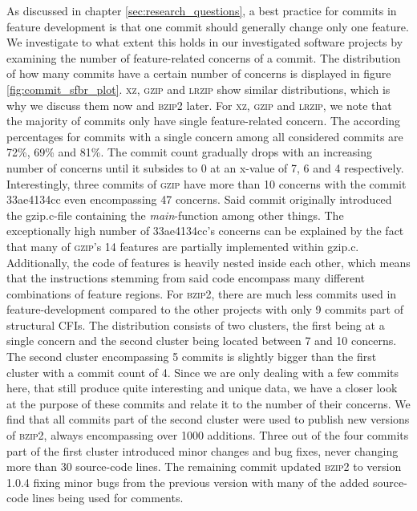 As discussed in chapter \ref{sec:research_questions}, a best practice for commits in feature development is that one commit should generally change only one feature.
We investigate to what extent this holds in our investigated software projects by examining the number of feature-related concerns of a commit.
The distribution of how many commits have a certain number of concerns is displayed in figure \ref{fig:commit_sfbr_plot}.
\textsc{xz}, \textsc{gzip} and \textsc{lrzip} show similar distributions, which is why we discuss them now and \textsc{bzip2} later.
For \textsc{xz}, \textsc{gzip} and \textsc{lrzip}, we note that the majority of commits only have single feature-related concern.
The according percentages for commits with a single concern among all considered commits are 72\%, 69\% and 81\%.
The commit count gradually drops with an increasing number of concerns until it subsides to 0 at an x-value of 7, 6 and 4 respectively.
Interestingly, three commits of \textsc{gzip} have more than 10 concerns with the commit \textsf{33ae4134cc} even encompassing 47 concerns.
Said commit originally introduced the \textsf{gzip.c}-file containing the \textsl{main}-function among other things.
The exceptionally high number of \textsf{33ae4134cc}'s concerns can be explained by the fact that many of \textsc{gzip}'s 14 features are partially implemented within \textsf{gzip.c}.
Additionally, the code of features is heavily nested inside each other, which means that the instructions stemming from said code encompass many different combinations of feature regions.
For \textsc{bzip2}, there are much less commits used in feature-development compared to the other projects with only 9 commits part of structural CFIs.
The distribution consists of two clusters, the first being at a single concern and the second cluster being located between 7 and 10 concerns.
The second cluster encompassing 5 commits is slightly bigger than the first cluster with a commit count of 4.
Since we are only dealing with a few commits here, that still produce quite interesting and unique data, we have a closer look at the purpose of these commits and relate it to the number of their concerns.
We find that all commits part of the second cluster were used to publish new versions of \textsc{bzip2}, always encompassing over 1000 additions.
Three out of the four commits part of the first cluster introduced minor changes and bug fixes, never changing more than 30 source-code lines.
The remaining commit updated \textsc{bzip2} to version 1.0.4 fixing minor bugs from the previous version with many of the added source-code lines being used for comments. 

